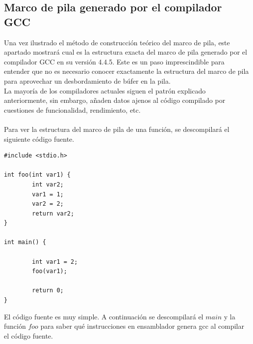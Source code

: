 \documentclass [titlepage, 12pt]{article}
\begin{document}
\subsection{Marco de pila generado por el compilador GCC}

Una vez ilustrado el m\'etodo de construcci\'on te\'orico del marco de pila, este apartado mostrar\'a cual es la estructura exacta del marco de pila generado por el compilador GCC en su versi\'on 4.4.5. Este es un paso imprescindible para entender que no es necesario conocer exactamente la estructura del marco de pila para aprovechar un desbordamiento de b\'ufer en la pila.\\
La mayor\'ia de los compiladores actuales siguen el patr\'on explicado anteriormente, sin embargo, a\~naden datos ajenos al c\'odigo compilado por cuestiones de funcionalidad, rendimiento, etc. \\
\\
Para ver la estructura del marco de pila de una funci\'on, se descompilar\'a el siguiente c\'odigo fuente.\\

\lstset{language=C++,caption=C\'odigo fuente stackFrame.c}
\begin{lstlisting}
#include <stdio.h>

int foo(int var1) {
        int var2;
        var1 = 1;
        var2 = 2;
        return var2;
}

int main() {

        int var1 = 2;
        foo(var1);

        return 0;
}
\end{lstlisting}

El c\'odigo fuente es muy simple. A continuaci\'on se descompilar\'a el $main$ y la funci\'on $foo$ para saber qu\'e instrucciones en ensamblador genera gcc al compilar el c\'odigo fuente.
\end{document}
